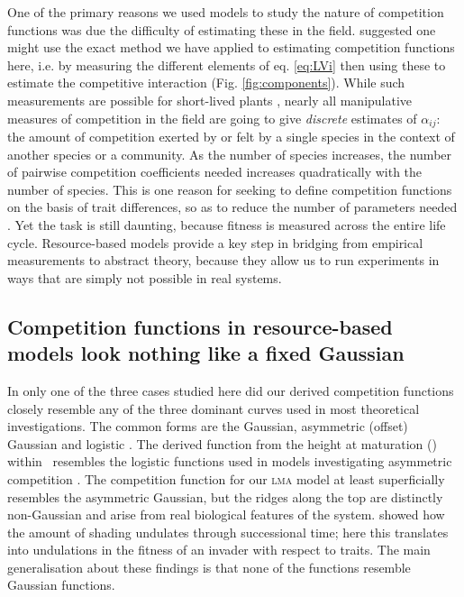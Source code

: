 \documentclass[a4paper,11pt]{article}
\begin{document}
One of the primary reasons we used models to study the nature of
competition functions was due the difficulty of estimating these in
the field. \citet{Ricklefs-1973} suggested one might use
the exact method we have
applied to estimating competition functions here, i.e. by measuring the
different elements of eq. \ref{eq:LVi} then using these to estimate
the competitive interaction (Fig. \ref{fig:components}).  While
such measurements are possible for short-lived plants
\citep{Kraft-2015}, nearly all manipulative measures of competition in
the field are going to give \emph{discrete} estimates of $\alpha_{ij}$: the
amount of competition exerted by or felt by a single species in the
context of another species or a community. As the number of species
increases, the number of pairwise competition coefficients needed
increases quadratically with the number of species. This is one reason
for seeking to define competition functions on the basis of trait
differences, so as to reduce the number of parameters needed
\citep{Kraft-2015}. Yet the task is still daunting, because fitness is measured
across the entire life cycle.  Resource-based models provide a key step in
bridging from empirical measurements to abstract theory, because they
allow us to run experiments in ways that are simply not possible in real systems.

\subsection{Competition functions in resource-based models look nothing like a
fixed Gaussian}

In only one of the three cases studied here did our derived
competition functions closely resemble any of the three dominant
curves used in most theoretical investigations. The common forms are
the Gaussian, asymmetric (offset) Gaussian \citep{Roughgarden-1979}
and logistic \citep[e.g.][]{Kisdi-1999, Law-1997}.  The derived
function from the height at maturation (\hmat) within \plant\
resembles the logistic functions used in models investigating
asymmetric competition \citep{Law-1997, Geritz-1999, Kisdi-1999,
  Calcagno-2006}.
%
The competition function for our \textsc{lma} model
at least superficially resembles the asymmetric Gaussian, but the
ridges along the top are distinctly non-Gaussian and arise from real
biological features of the system.
%
\citet{Falster-2011} showed how the amount of shading undulates
through successional time; here this translates into undulations in
the fitness of an invader with respect to traits.
%
The main generalisation about these findings is that
none of the functions resemble Gaussian functions.
\end{document}
